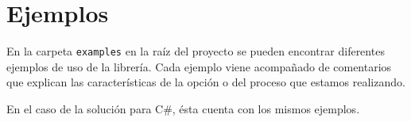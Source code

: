 \documentclass[12pt,a4paper,final]{article}
\begin{document}
\section{Ejemplos}
	En la carpeta \texttt{examples} en la raíz del proyecto se pueden encontrar diferentes ejemplos
	de uso de la librería. Cada ejemplo viene acompañado de comentarios que explican las características
	de la opción o del proceso que estamos realizando.

	En el caso de la solución para C\#, ésta cuenta con los mismos ejemplos.
\printindex
\end{document}
